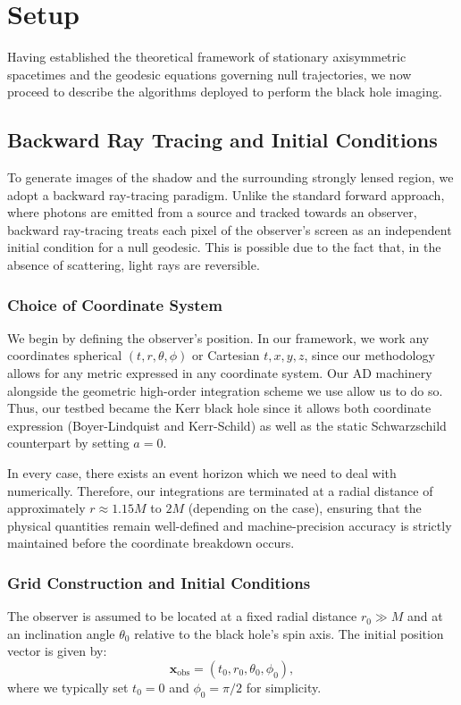 \documentclass[11pt]{book}
\begin{document}
\chapter{Setup}

Having established the theoretical framework of stationary axisymmetric spacetimes and the geodesic equations governing null trajectories, we now proceed to describe the algorithms deployed to perform the black hole imaging.

\section{Backward Ray Tracing and Initial Conditions}

To generate images of the shadow and the surrounding strongly lensed region, we adopt a backward ray-tracing paradigm. Unlike the standard forward approach, where photons are emitted from a source and tracked towards an observer, backward ray-tracing treats each pixel of the observer's screen as an independent initial condition for a null geodesic. This is possible due to the fact that, in the absence of scattering, light rays are reversible. 

\subsection{Choice of Coordinate System}
We begin by defining the observer's position. In our framework, we work any coordinates spherical \((t, r, \theta, \phi)\) or Cartesian \(t,x,y,z\), since our methodology allows for any metric expressed in any coordinate system. Our AD machinery alongside the geometric high-order integration scheme we use allow us to do so. Thus, our testbed became the Kerr black hole since it allows both coordinate expression (Boyer-Lindquist and Kerr-Schild) as well as the static Schwarzschild counterpart by setting $a=0$.

In every case, there exists an event horizon which we need to deal with numerically. Therefore, our integrations are terminated at a radial distance of approximately \(r \approx 1.15 M\) to \(2 M\) (depending on the case), ensuring that the physical quantities remain well-defined and machine-precision accuracy is strictly maintained before the coordinate breakdown occurs.

\subsection{Grid Construction and Initial Conditions}
The observer is assumed to be located at a fixed radial distance \(r_0 \gg M\) and at an inclination angle \(\theta_0\) relative to the black hole's spin axis. The initial position vector is given by:
\begin{equation}
    \bm{x}_{\text{obs}} = (t_0, r_0, \theta_0, \phi_0),
\end{equation}
where we typically set \(t_0 = 0\) and \(\phi_0 = \pi/2\) for simplicity. 
\end{document}
